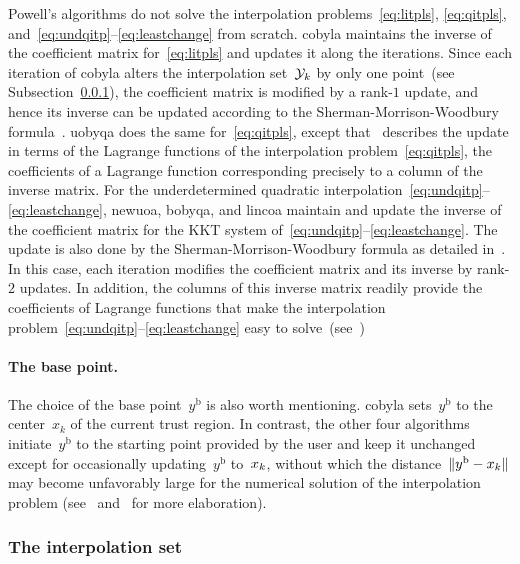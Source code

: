 \documentclass[
    smallextended,  %
    final,        %
]{svjour3}
\newcommand{\base}{{\text{b}}}
\newcommand{\iter}[1][k]{x\ifthenelse{\equal{#1}{}}{}{_{#1}}}
\newcommand{\xpt}[1][k]{\mathcal{Y}\ifthenelse{\equal{#1}{}}{}{_{#1}}}
\begin{document}
Powell's algorithms do not solve the interpolation problems~\eqref{eq:litpls}, \eqref{eq:qitpls},
and~\mbox{\eqref{eq:undqitp}--\eqref{eq:leastchange}} from scratch.
\gls{cobyla} maintains the inverse of the coefficient matrix for~\eqref{eq:litpls}
and updates it along the iterations.
Since each iteration of \gls{cobyla} alters the interpolation set~$\xpt$ by only one
point~(see Subsection~\ref{ssec:iptset}), the coefficient matrix is modified by a rank-$1$ update, and hence
its inverse can be updated according to the Sherman-Morrison-Woodbury formula~\cite{Hager_1989}.
\gls{uobyqa} does the same for~\eqref{eq:qitpls},
except that~\cite[\S~4]{Powell_2002} describes the update in terms of the Lagrange functions of the
interpolation problem~\eqref{eq:qitpls}, the coefficients of a Lagrange function corresponding
precisely to a column of the inverse matrix.
For the underdetermined quadratic interpolation~\mbox{\eqref{eq:undqitp}--\eqref{eq:leastchange}},
\gls{newuoa}, \gls{bobyqa}, and \gls{lincoa}
maintain and update the inverse of the coefficient matrix for the KKT system
of~\mbox{\eqref{eq:undqitp}--\eqref{eq:leastchange}}. The update is also done by the
Sherman-Morrison-Woodbury formula as detailed in~\cite[\S~2]{Powell_2004c}. In this case, each
iteration modifies the coefficient matrix and its inverse by rank-$2$ updates.
In addition, the columns of this inverse matrix readily provide the coefficients of Lagrange
functions that make the interpolation problem~\mbox{\eqref{eq:undqitp}--\eqref{eq:leastchange}}
easy to solve~(see~\mbox{\cite[\S~3]{Powell_2004b}})


\paragraph{\textnormal{\textbf{The base point.}}}

The choice of the base point~$y^{\base}$ is also worth mentioning.
\Gls{cobyla} sets~$y^{\base}$ to the center~$x_k$ of the current trust region.
In contrast, the other four algorithms initiate~$y^{\base}$ to the starting point provided by the
user and keep it unchanged except for occasionally updating~$y^{\base}$ to~$\iter$, without which
the distance~$\|y^{\base}-\iter\|$ may become unfavorably large for the numerical solution of the
interpolation problem (see~\cite[\S~5]{Powell_2004b} and~\cite[\S~7]{Powell_2006} for more elaboration).

\subsubsection{The interpolation set}
\label{ssec:iptset}
\end{document}
